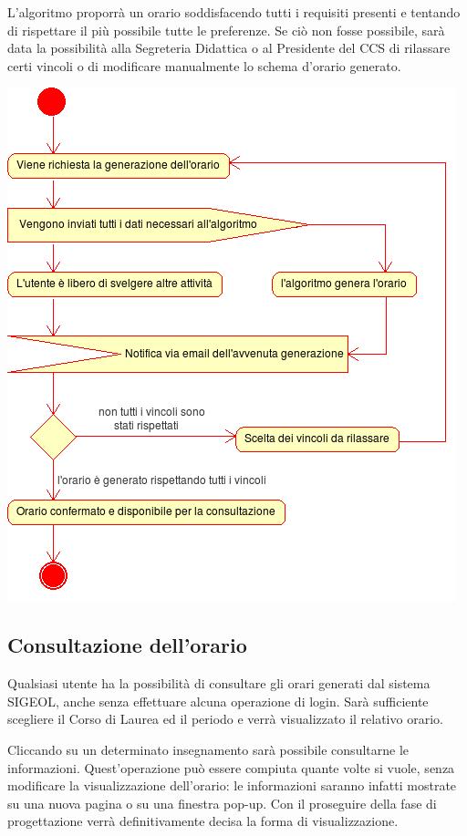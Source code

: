 \documentclass[11pt,a4paper]{article}
\begin{document}
L'algoritmo proporrà un orario soddisfacendo tutti i requisiti presenti e tentando di rispettare il più possibile tutte le preferenze. Se ciò non fosse possibile, sarà data la possibilità alla Segreteria Didattica o al Presidente del CCS di rilassare certi vincoli o di modificare manualmente lo schema d'orario generato.
\begin{center}
 \includegraphics[scale=0.85]{images/generazione_orario.png}
\end{center}

\newpage
\subsection{Consultazione dell'orario}
Qualsiasi utente ha la possibilità di consultare gli orari generati dal sistema SIGEOL, anche senza effettuare alcuna operazione di login. Sarà sufficiente scegliere il Corso di Laurea ed il periodo e verrà visualizzato il relativo orario.

Cliccando su un determinato insegnamento sarà possibile consultarne le informazioni.
Quest'operazione può essere compiuta quante volte si vuole, senza modificare la visualizzazione dell'orario: le informazioni saranno infatti mostrate su una nuova pagina o su una finestra pop-up. Con il proseguire della fase di progettazione verrà definitivamente decisa la forma di visualizzazione.
\end{document}
